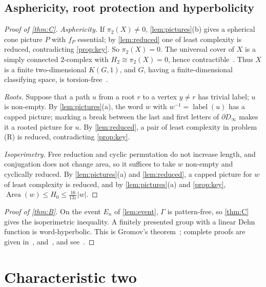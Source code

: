 \documentclass[11pt]{article}
\theoremstyle{definition}
\theoremstyle{plain}
\newcommand{\eps}{\varepsilon}
\newcommand{\Area}{\operatorname{Area}}
\begin{document}
\subsection{Asphericity, root protection and hyperbolicity}

\begin{proof}[Proof of \cref{thm:C}]
\emph{Asphericity.} If $\pi_2(X)\neq0$, \cref{lem:pictures}(b) gives a spherical cone picture $P$ with $f_P$ essential; by \cref{lem:reduced} one of least complexity is reduced, contradicting \cref{prop:key}. So $\pi_2(X)=0$. The universal cover of $X$ is a simply connected $2$-complex with $H_2\cong\pi_2(X)=0$, hence contractible~\cite[Thm.~4.32, Cor.~4.33]{Hatcher2002}. Thus $X$ is a finite two-dimensional $K(G,1)$, and $G$, having a finite-dimensional classifying space, is torsion-free~\cite[\S VIII.2]{Brown1982}.

\emph{Roots.} Suppose that a path $u$ from a root $r$ to a vertex $y\neq r$ has trivial label; $u$ is non-empty. By \cref{lem:pictures}(a), the word $w$ with $w^{-1}=\operatorname{label}(u)$ has a capped picture; marking a break between the last and first letters of $\partial D_\infty$ makes it a rooted picture for $u$. By \cref{lem:reduced}, a pair of least complexity in problem (R) is reduced, contradicting \cref{prop:key}.

\emph{Isoperimetry.} Free reduction and cyclic permutation do not increase length, and conjugation does not change area, so it suffices to take $w$ non-empty and cyclically reduced. By \cref{lem:pictures}(a) and \cref{lem:reduced}, a capped picture for $w$ of least complexity is reduced, and by \cref{lem:pictures}(a) and \cref{prop:key}, $\Area(w)\le H_0\le\frac{16}{13\eps}|w|$.
\end{proof}

\begin{proof}[Proof of \cref{thm:B}]
On the event $E_n$ of \cref{lem:event}, $\Gamma$ is pattern-free, so \cref{thm:C} gives the isoperimetric inequality. A finitely presented group with a linear Dehn function is word-hyperbolic. This is Gromov's theorem~\cite[2.3.D, proved in 6.8]{Gromov1987}; complete proofs are given in~\cite[Thm.~2.5]{ABCFLMSS1991}, \cite{Olshanskii1991} and~\cite[Thm.~III.H.2.9]{BridsonHaefliger1999}, and see~\cite[Thm.~6.1.5]{Bridson2002}.
\end{proof}
\section{Characteristic two}\label{sec:proofA}
\end{document}
